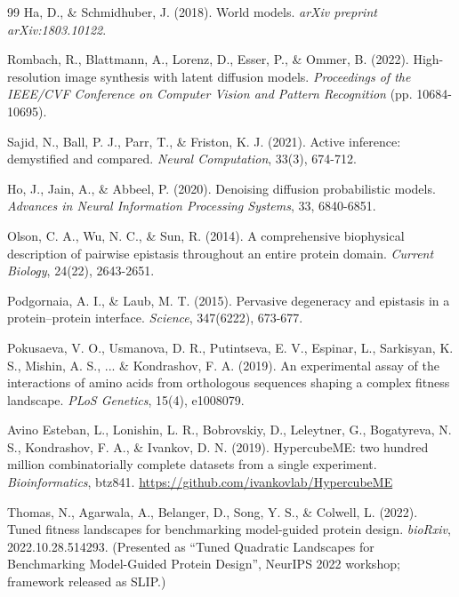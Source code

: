 \documentclass[12pt, a4paper]{article}
\begin{document}
\begin{thebibliography}{99}
Ha, D., \& Schmidhuber, J. (2018). \newblock World models. \newblock \textit{arXiv preprint arXiv:1803.10122}.


Rombach, R., Blattmann, A., Lorenz, D., Esser, P., \& Ommer, B. (2022). \newblock High-resolution image synthesis with latent diffusion models. \newblock \textit{Proceedings of the IEEE/CVF Conference on Computer Vision and Pattern Recognition} (pp. 10684-10695).


Sajid, N., Ball, P. J., Parr, T., \& Friston, K. J. (2021). \newblock Active inference: demystified and compared. \newblock \textit{Neural Computation}, 33(3), 674-712.


Ho, J., Jain, A., \& Abbeel, P. (2020). \newblock Denoising diffusion probabilistic models. \newblock \textit{Advances in Neural Information Processing Systems}, 33, 6840-6851.


Olson, C. A., Wu, N. C., \& Sun, R. (2014). \newblock A comprehensive biophysical description of pairwise epistasis throughout an entire protein domain. \newblock \textit{Current Biology}, 24(22), 2643-2651.


Podgornaia, A. I., \& Laub, M. T. (2015). \newblock Pervasive degeneracy and epistasis in a protein--protein interface. \newblock \textit{Science}, 347(6222), 673-677.


Pokusaeva, V. O., Usmanova, D. R., Putintseva, E. V., Espinar, L., Sarkisyan, K. S., Mishin, A. S., ... \& Kondrashov, F. A. (2019). \newblock An experimental assay of the interactions of amino acids from orthologous sequences shaping a complex fitness landscape. \newblock \textit{PLoS Genetics}, 15(4), e1008079.


Avino Esteban, L., Lonishin, L. R., Bobrovskiy, D., Leleytner, G., Bogatyreva, N. S., Kondrashov, F. A., \& Ivankov, D. N. (2019). \newblock HypercubeME: two hundred million combinatorially complete datasets from a single experiment. \newblock \textit{Bioinformatics}, btz841. \url{https://github.com/ivankovlab/HypercubeME}


Thomas, N., Agarwala, A., Belanger, D., Song, Y. S., \& Colwell, L. (2022). \newblock Tuned fitness landscapes for benchmarking model-guided protein design. \newblock \textit{bioRxiv}, 2022.10.28.514293. (Presented as ``Tuned Quadratic Landscapes for Benchmarking Model-Guided Protein Design'', NeurIPS 2022 workshop; framework released as SLIP.)



\end{thebibliography}
\end{document}

